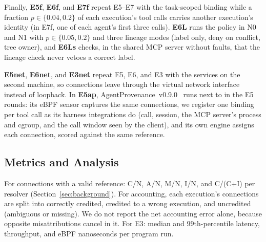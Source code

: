 Finally, \textbf{E5f}, \textbf{E6f}, and \textbf{E7f} repeat E5--E7 with the task-scoped binding while a fraction $p \in \{0.04, 0.2\}$ of each execution's tool calls carries another execution's identity (in E7f, one of each agent's first three calls). \textbf{E6L} runs the policy in N0 and N1 with $p \in \{0.05, 0.2\}$ and three lineage modes (label only, deny on conflict, tree owner), and \textbf{E6Ls} checks, in the shared MCP server without faults, that the lineage check never vetoes a correct label.

\textbf{E5net}, \textbf{E6net}, and \textbf{E3net} repeat E5, E6, and E3 with the services on the second machine, so connections leave through the virtual network interface instead of loopback. In \textbf{E5ap}, AgentProvenance~v0.9.0~\cite{byteyellow2026agentprovenance} runs next to \solution{} in the E5 rounds: its eBPF sensor captures the same connections, we register one binding per tool call as its harness integrations do (call, session, the MCP server's process and cgroup, and the call window seen by the client), and its own engine assigns each connection, scored against the same reference.

\subsection{Metrics and Analysis}
For connections with a valid reference: C/N, A/N, M/N, I/N, and C/(C+I) per resolver (\cf Section~\ref{sec:background}). For accounting, each execution's connections are split into correctly credited, credited to a wrong execution, and uncredited (ambiguous or missing). We do not report the net accounting error alone, because opposite misattributions cancel in it. For E3: median and 99th-percentile latency, throughput, and eBPF nanoseconds per program run.

